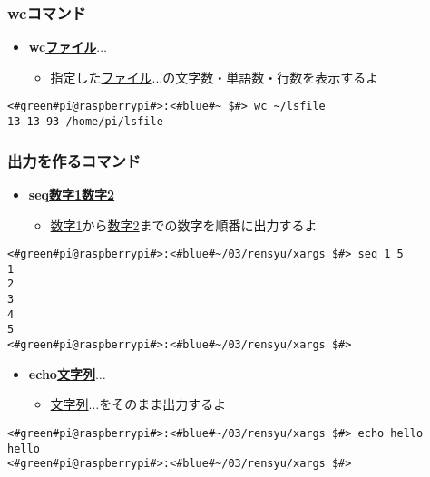 \begin{frame}[fragile]
    \frametitle{wcコマンド}
    \begin{itemize}
        \item {\bf wc\textvisiblespace\underline{ファイル}$\ldots$}
        \begin{itemize}
            \small
            \item[] 指定した\underline{ファイル}$\ldots$の文字数・単語数・行数を表示するよ
        \end{itemize}
    \end{itemize}
    \begin{lstlisting}[title=wcコマンドの実行例, label=wc_example]
<#green#pi@raspberrypi#>:<#blue#~ $#> wc ~/lsfile
13 13 93 /home/pi/lsfile
    \end{lstlisting}
\end{frame}

\begin{frame}[fragile]
    \frametitle{出力を作るコマンド}
    \begin{itemize}
        \item {\bf seq\textvisiblespace\underline{数字1}\textvisiblespace\underline{数字2}}
        \begin{itemize}
            \small
            \item[] \underline{数字1}から\underline{数字2}までの数字を順番に出力するよ
        \end{itemize}
    \end{itemize}
    \begin{lstlisting}
<#green#pi@raspberrypi#>:<#blue#~/03/rensyu/xargs $#> seq 1 5
1
2
3
4
5
<#green#pi@raspberrypi#>:<#blue#~/03/rensyu/xargs $#>
    \end{lstlisting}
    \begin{itemize}
        \item {\bf echo\textvisiblespace\underline{文字列}$\ldots$}
        \begin{itemize}
            \small
            \item[] \underline{文字列}$\ldots$をそのまま出力するよ
        \end{itemize}
    \end{itemize}
    \begin{lstlisting}
<#green#pi@raspberrypi#>:<#blue#~/03/rensyu/xargs $#> echo hello
hello
<#green#pi@raspberrypi#>:<#blue#~/03/rensyu/xargs $#>
    \end{lstlisting}
\end{frame}

